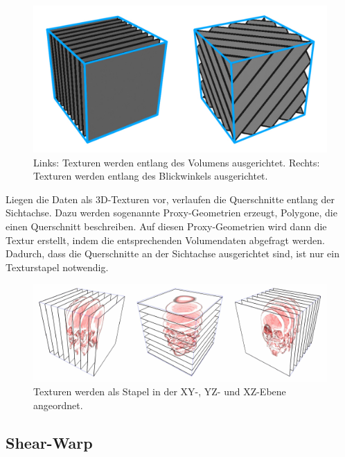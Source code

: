 \begin{figure}[!htb]
	\centering
	\includegraphics[width=0.7\linewidth]{images/texture_2d3d.pdf}
	\caption{Links: Texturen werden entlang des Volumens ausgerichtet. Rechts: Texturen werden entlang des Blickwinkels ausgerichtet.}
	\label{img:2D3DTex}
\end{figure}
\FloatBarrier

Liegen die Daten als 3D-Texturen vor, verlaufen die Querschnitte entlang der Sichtachse. Dazu werden sogenannte Proxy-Geometrien erzeugt, Polygone, die einen Querschnitt beschreiben. Auf diesen Proxy-Geometrien wird dann die Textur erstellt, indem die entsprechenden Volumendaten abgefragt werden. Dadurch, dass die Querschnitte an der Sichtachse ausgerichtet sind, ist nur ein Texturstapel notwendig. 




\begin{figure}[!htb]
	\centering
	\includegraphics[width=0.7\linewidth]{images/textureStacks.png}
	\caption{Texturen werden als Stapel in der 	XY-, YZ- und XZ-Ebene angeordnet.}
	\label{img:textureBased}
\end{figure}
\FloatBarrier

\subsection{Shear-Warp}

